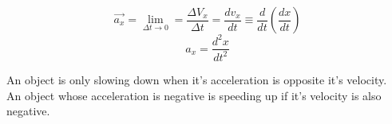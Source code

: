 \documentclass[]{article}
\begin{document}
\begin{equation*}
    \vec{a_x} = \lim_{\Delta t \to 0} = \frac{\Delta V_x}{\Delta t} = \frac{dv_x}{dt} \equiv \frac{d}{dt}(\frac{dx}{dt})
\end{equation*}
\begin{equation*}
    a_x = \frac{d^2x}{dt^2}
\end{equation*}

\newpage
An object is only slowing down when it's acceleration is opposite it's velocity.\\
An object whose acceleration is negative is speeding up if it's velocity is also negative.
\end{document}
